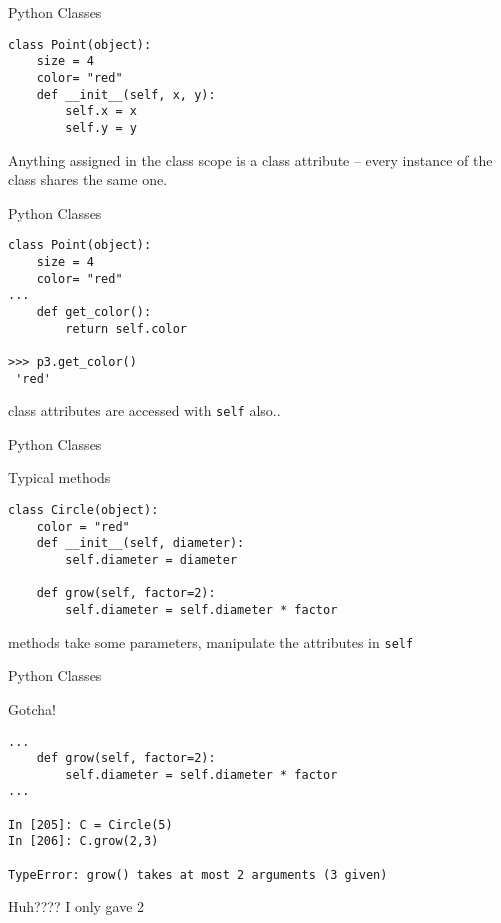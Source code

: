 \documentclass{beamer}
\begin{document}
\begin{frame}[fragile]{Python Classes}

\begin{verbatim}
class Point(object):
    size = 4
    color= "red"
    def __init__(self, x, y):
        self.x = x
        self.y = y
\end{verbatim}

\vfill
{\Large Anything assigned in the class scope is a class attribute -- every
instance of the class shares the same one.}
\vfill
\end{frame} 

\begin{frame}[fragile]{Python Classes}

\begin{verbatim}
class Point(object):
    size = 4
    color= "red"
...
    def get_color():
        return self.color

>>> p3.get_color()
 'red'
\end{verbatim}

\vfill
{\Large class attributes are accessed with \verb|self| also..} 
\vfill
\end{frame} 


\begin{frame}[fragile]{Python Classes}

{\Large Typical methods}
\begin{verbatim}
class Circle(object):
    color = "red"
    def __init__(self, diameter):
        self.diameter = diameter

    def grow(self, factor=2):
        self.diameter = self.diameter * factor
\end{verbatim}

\vfill
{\Large methods take some parameters, manipulate the attributes in \verb|self|} 

\end{frame} 

\begin{frame}[fragile]{Python Classes}

{\Large Gotcha!}
\begin{verbatim}
...
    def grow(self, factor=2):
        self.diameter = self.diameter * factor
...

In [205]: C = Circle(5)
In [206]: C.grow(2,3)

TypeError: grow() takes at most 2 arguments (3 given)

\end{verbatim}

\vfill
{\LARGE Huh???? I only gave 2} 
\end{frame} 
\end{document}
